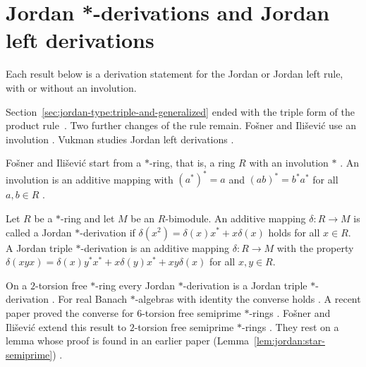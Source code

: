 \section{Jordan *-derivations and Jordan left derivations}\label{sec:jordan-type:star-left}

Each result below is a derivation statement for the Jordan or Jordan left
rule, with or without an involution. %

Section~\ref{sec:jordan-type:triple-and-generalized} ended with the triple
form of the product rule~\cite[p.~1]{Vukman1997}. Two further changes of the rule remain. Fošner and
Ilišević use an involution \cite[p.~416]{FosnerIlisevic2008}. Vukman studies
Jordan left derivations \cite[p.~1]{Vukman1997}.

Fošner and Ilišević start from a $\ast$-ring, that is, a ring $R$ with an
involution $\ast$ \cite[Section~1, p.~415]{FosnerIlisevic2008}. An involution
is an additive mapping with $(a^{\ast})^{\ast}=a$ and
$(ab)^{\ast}=b^{\ast}a^{\ast}$ for all $a,b\in R$
\cite[p.~415]{FosnerIlisevic2008}.

\begin{definition}\label{def:jordan:star}
Let $R$ be a $\ast$-ring and let $M$ be an $R$-bimodule. An additive mapping $\delta\colon R\to M$ is
called a Jordan $\ast$-derivation if $\delta(x^{2})=\delta(x)x^{\ast}+x\delta(x)$ holds for all
$x\in R$. A Jordan triple $\ast$-derivation is an additive mapping $\delta\colon R\to M$ with the
property $\delta(xyx)=\delta(x)y^{\ast}x^{\ast}+x\delta(y)x^{\ast}+xy\delta(x)$ for all $x,y\in R$.
\end{definition}

On a $2$-torsion free $\ast$-ring every Jordan $\ast$-derivation is a Jordan
triple $\ast$-derivation \cite[p.~417]{FosnerIlisevic2008}. For real Banach
$\ast$-algebras with identity the converse holds
\cite[p.~417]{FosnerIlisevic2008}. A recent paper proved the converse for
$6$-torsion free semiprime $\ast$-rings \cite[p.~417]{FosnerIlisevic2008}.
Fošner and Ilišević extend this result to $2$-torsion free semiprime
$\ast$-rings \cite[p.~417]{FosnerIlisevic2008}. They rest on a lemma whose
proof is found in an earlier paper (Lemma~\ref{lem:jordan:star-semiprime})
\cite[p.~425]{FosnerIlisevic2008}.

